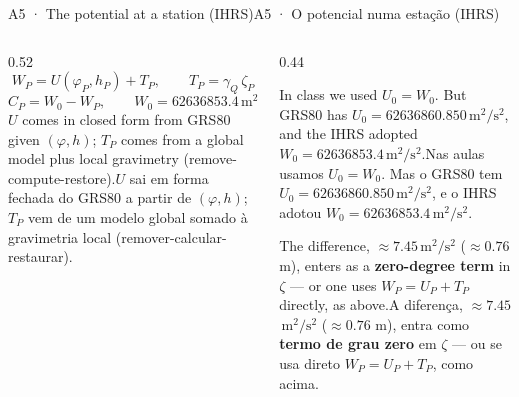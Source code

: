 \documentclass[aspectratio=169,11pt]{beamer}
\newcommand{\tr}[2]{\ifEN#2\else#1\fi}
\newcommand{\mmss}{\ensuremath{\,\mathrm{m^2/s^2}}\xspace}
\begin{document}
\begin{frame}{\tr{A5 · O potencial numa estação (IHRS)}{A5 · The potential at a station (IHRS)}}
  \small
  \begin{columns}[T]
    \begin{column}{0.52\textwidth}
      \[ W_P = U(\varphi_P, h_P) + T_P, \qquad T_P = \gamma_Q\,\zeta_P \]
      \[ C_P = W_0 - W_P, \qquad W_0 = \num{62636853.4}\mmss \]
      \tr{$U$ sai em forma fechada do GRS80 a partir de $(\varphi, h)$; $T_P$ vem de um modelo
      global somado à gravimetria local (remover-calcular-restaurar).}{$U$ comes in closed
      form from GRS80 given $(\varphi, h)$; $T_P$ comes from a global model plus local
      gravimetry (remove-compute-restore).}
    \end{column}
    \begin{column}{0.44\textwidth}
      \begin{cuidado}[title={$U_0 \neq W_0$}]
        \raggedright\tr{Nas aulas usamos $U_0 = W_0$. Mas o GRS80 tem $U_0 = \num{62636860.850}$\mmss, e o
        IHRS adotou $W_0 = \num{62636853.4}$\mmss.}{In class we used $U_0 = W_0$. But GRS80
        has $U_0 = \num{62636860.850}$\mmss, and the IHRS adopted $W_0 =
        \num{62636853.4}$\mmss.}
        \medskip

        \tr{A diferença, $\approx \num{7.45}$\mmss{} ($\approx \num{0.76}$ m), entra como
        \textbf{termo de grau zero} em $\zeta$ --- ou se usa direto $W_P = U_P + T_P$, como
        acima.}{The difference, $\approx \num{7.45}$\mmss{} ($\approx \num{0.76}$ m), enters
        as a \textbf{zero-degree term} in $\zeta$ --- or one uses $W_P = U_P + T_P$ directly,
        as above.}
      \end{cuidado}
    \end{column}
  \end{columns}
\end{frame}
\end{document}
